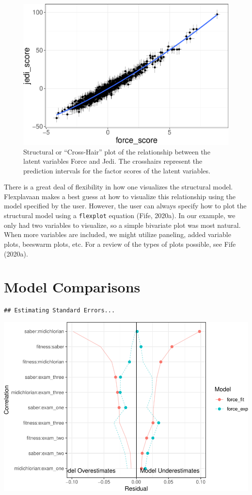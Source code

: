 \documentclass[
  english,
  doc]{apa6}
\begin{document}
\begin{figure}
\centering
\includegraphics{flexplavaan_draft_files/figure-latex/beech-1.pdf}
\caption{\label{fig:beech}Structural or ``Cross-Hair'' plot of the relationship between the latent variables Force and Jedi. The crosshairs represent the prediction intervals for the factor scores of the latent variables.}
\end{figure}

There is a great deal of flexibility in how one visualizes the structural model. Flexplavaan makes a best guess at how to visualize this relationship using the model specified by the user. However, the user can always specify how to plot the structural model using a \texttt{flexplot} equation (Fife, 2020a). In our example, we only had two variables to visualize, so a simple bivariate plot was most natural. When more variables are included, we might utilize paneling, added variable plots, beeswarm plots, etc. For a review of the types of plots possible, see Fife (2020a).

\hypertarget{model-comparisons}{%
\section{Model Comparisons}\label{model-comparisons}}

\begin{verbatim}
## Estimating Standard Errors...
\end{verbatim}

\includegraphics{flexplavaan_draft_files/figure-latex/unnamed-chunk-1-1.pdf}
\end{document}
